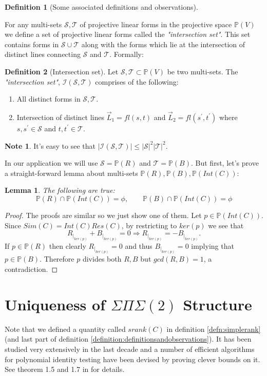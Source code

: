 \documentclass[12pt]{caltech_thesis}
\theoremstyle{plain}
\newtheorem{lemma}{Lemma}
\theoremstyle{definition}
\newtheorem{definition}{Definition}
\newtheorem{note}{Note}
\newcommand{\MS}{\mathcal{S}}
\newcommand{\MT}{\mathcal{T}}
\newcommand{\MI}{\mathcal{I}}
\newcommand{\PP}{\mathbb{P}}
\begin{document}
\begin{definition}[Some associated definitions and observations]
\begin{itemize}
\end{itemize} 
 
 
\end{definition}


For any multi-sets $\MS,\MT$ of projective linear forms in the projective space $\PP(V)$ we define a 
set of projective linear forms called the \emph{"intersection set"}. This set contains forms in
$\MS\cup \MT$ along with the forms which lie at the intersection of distinct lines connecting $\MS$ and $\MT$. Formally:

\begin{definition}[Intersection set]\label{definition:intersectionset}
 Let $\MS,\MT\subset \PP(V)$ be two multi-sets. The \emph{"intersection set"}, $\MI(\MS,\MT)$ comprises of the following:
 \begin{enumerate}
  \item All distinct forms in $\MS,\MT$.
  \item Intersection of distinct lines $\vec L_1 = fl(s,t)$ and $\vec L_2 = fl(s^\prime,t^\prime)$ where $s,s^\prime\in \MS$ and $t,t^\prime\in \MT$. 
 \end{enumerate}
\end{definition}

\begin{note}
It's easy to see that $|\MI(\MS,\MT)|\leq |\MS|^2 |\MT|^2$.
\end{note}

In our application we will use $\MS=\PP(R)$ and $\MT=\PP(B)$. But first, let's prove a straight-forward lemma about 
multi-sets $\PP(R),\PP(B),\PP(Int(C))$:
\begin{lemma}\label{lemma:internalandgates}
The following are true:
\[
 \PP(R)\cap \PP(Int(C)) = \phi, \hspace{2em} \PP(B)\cap \PP(Int(C))=\phi
\]
\end{lemma}
\begin{proof}
 The proofs are similar so we just show one of them. Let $p\in \PP(Int(C))$. Since $Sim(C) = Int(C)Res(C)$, by restricting to $ker(p)$ 
 we see that
 \[
  R_{|_{ker(p)}} + B_{|_{ker(p)}}= 0\Rightarrow R_{|_{ker(p)}} = -B_{|_{ker(p)}}.
 \]
 If $p\in \PP(R)$ then clearly $R_{|_{ker(p)}}=0$ and thus $B_{|_{ker(p)}}=0$ implying that $p\in \PP(B)$. Therefore $p$ divides both $R,B$ but
 $gcd(R,B)= 1$,  a contradiction. 
\end{proof}





\section{Uniqueness of $\Sigma\Pi\Sigma(2)$ Structure}\label{section:uniqueness}
Note that we defined a quantity called $srank(C)$ in definition \ref{defn:simplerank} (and last part of 
definition \ref{definition:definitionsandobservations}). 
It has been studied very extensively in the last decade and a number of efficient algorithms
for polynomial identity testing have been devised by proving clever bounds on it. 
See theorem 1.5 and 1.7 in \cite{SS10} for details. 
\end{document}
